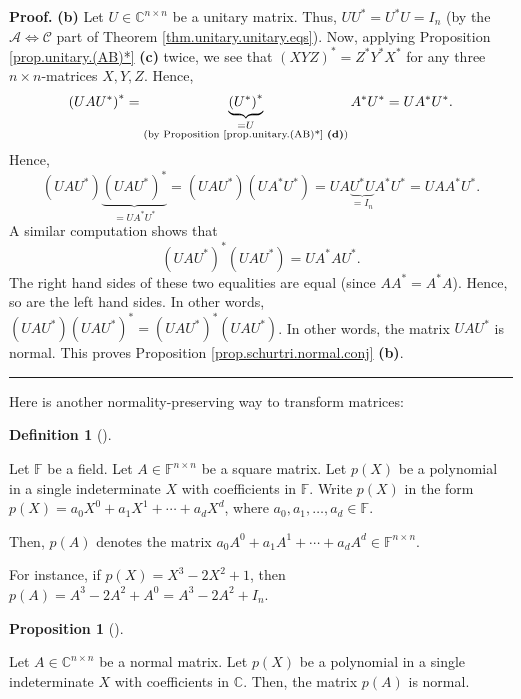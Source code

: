 \documentclass[numbers=enddot,12pt,final,onecolumn,notitlepage]{scrartcl}%
\numberwithin{exer}{subsection}
\theoremstyle{definition}
\newtheorem{prop}[theo]{Proposition}
\newenvironment{proposition}[1][]
{\begin{prop}[#1]\begin{leftbar}}
{\end{leftbar}\end{prop}}
\newtheorem{defi}[theo]{Definition}
\newenvironment{definition}[1][]
{\begin{defi}[#1]\begin{leftbar}}
{\end{leftbar}\end{defi}}
\newenvironment{proof}[1][Proof]{\noindent\textbf{#1.} }{\ \rule{0.5em}{0.5em}}
\begin{document}
\begin{proof}
\textbf{(b)} Let $U\in\mathbb{C}^{n\times n}$ be a unitary matrix. Thus,
$UU^{\ast}=U^{\ast}U=I_{n}$ (by the $\mathcal{A}\Longleftrightarrow
\mathcal{C}$ part of Theorem \ref{thm.unitary.unitary.eqs}). Now, applying
Proposition \ref{prop.unitary.(AB)*} \textbf{(c)} twice, we see that $\left(
XYZ\right)  ^{\ast}=Z^{\ast}Y^{\ast}X^{\ast}$ for any three $n\times
n$-matrices $X,Y,Z$. Hence,%
\[
\left(  UAU^{\ast}\right)  ^{\ast}=\underbrace{\left(  U^{\ast}\right)
^{\ast}}_{\substack{=U\\\text{(by Proposition \ref{prop.unitary.(AB)*}
\textbf{(d)})}}}A^{\ast}U^{\ast}=UA^{\ast}U^{\ast}.
\]
Hence,%
\[
\left(  UAU^{\ast}\right)  \underbrace{\left(  UAU^{\ast}\right)  ^{\ast}%
}_{=UA^{\ast}U^{\ast}}=\left(  UAU^{\ast}\right)  \left(  UA^{\ast}U^{\ast
}\right)  =UA\underbrace{U^{\ast}U}_{=I_{n}}A^{\ast}U^{\ast}=UAA^{\ast}%
U^{\ast}.
\]
A similar computation shows that%
\[
\left(  UAU^{\ast}\right)  ^{\ast}\left(  UAU^{\ast}\right)  =UA^{\ast
}AU^{\ast}.
\]
The right hand sides of these two equalities are equal (since $AA^{\ast
}=A^{\ast}A$). Hence, so are the left hand sides. In other words, $\left(
UAU^{\ast}\right)  \left(  UAU^{\ast}\right)  ^{\ast}=\left(  UAU^{\ast
}\right)  ^{\ast}\left(  UAU^{\ast}\right)  $. In other words, the matrix
$UAU^{\ast}$ is normal. This proves Proposition
\ref{prop.schurtri.normal.conj} \textbf{(b)}.
\end{proof}

Here is another normality-preserving way to transform matrices:

\begin{definition}
\label{def.schurtri.normal.p(A)}Let $\mathbb{F}$ be a field. Let
$A\in\mathbb{F}^{n\times n}$ be a square matrix. Let $p\left(  X\right)  $ be
a polynomial in a single indeterminate $X$ with coefficients in $\mathbb{F}$.
Write $p\left(  X\right)  $ in the form $p\left(  X\right)  =a_{0}X^{0}%
+a_{1}X^{1}+\cdots+a_{d}X^{d}$, where $a_{0},a_{1},\ldots,a_{d}\in\mathbb{F}$.

Then, $p\left(  A\right)  $ denotes the matrix $a_{0}A^{0}+a_{1}A^{1}%
+\cdots+a_{d}A^{d}\in\mathbb{F}^{n\times n}$.
\end{definition}

For instance, if $p\left(  X\right)  =X^{3}-2X^{2}+1$, then $p\left(
A\right)  =A^{3}-2A^{2}+A^{0}=A^{3}-2A^{2}+I_{n}$.

\begin{proposition}
\label{prop.schurtri.normal.p(A)nor}Let $A\in\mathbb{C}^{n\times n}$ be a
normal matrix. Let $p\left(  X\right)  $ be a polynomial in a single
indeterminate $X$ with coefficients in $\mathbb{C}$. Then, the matrix
$p\left(  A\right)  $ is normal.
\end{proposition}
\end{document}
